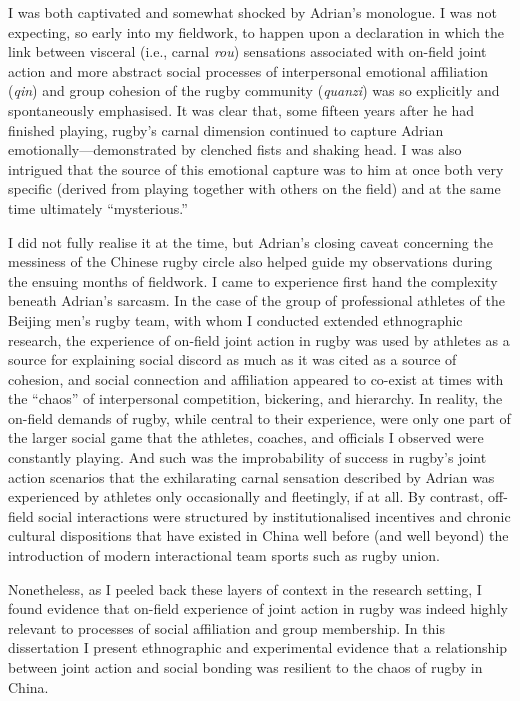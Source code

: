 
I was both captivated and somewhat shocked by Adrian's monologue. I was not expecting, so early into my fieldwork, to happen upon a declaration in which the link between visceral (i.e., carnal \textit{rou}) sensations associated with on-field joint action and more abstract social processes of interpersonal emotional affiliation (\textit{qin}) and group cohesion of the rugby community (\textit{quanzi}) was so explicitly and spontaneously emphasised.  It was clear that, some fifteen years after he had finished playing, rugby's carnal dimension continued to capture Adrian emotionally---demonstrated by clenched fists and shaking head.  I was also intrigued that the source of this emotional capture was to him at once both very specific (derived from playing together with others on the field) and at the same time ultimately ``mysterious.''

I did not fully realise it at the time, but Adrian's closing caveat concerning the messiness of the Chinese rugby circle also helped guide my observations during the ensuing months of fieldwork.  I came to experience first hand the complexity beneath Adrian's sarcasm.  In the case of the group of professional athletes of the Beijing men's rugby team, with whom I conducted extended ethnographic research, the experience of on-field joint action in rugby was used by athletes as a source for explaining social discord as much as it was cited as a source of cohesion, and social connection and affiliation appeared to co-exist at times with the ``chaos'' of interpersonal competition, bickering, and hierarchy.  In reality, the on-field demands of rugby, while central to their experience, were only one part of the larger social game that the athletes, coaches, and officials I observed were constantly playing.  And such was the improbability of success in rugby's joint action scenarios that the exhilarating carnal sensation described by Adrian was experienced by athletes only occasionally and fleetingly, if at all.  By contrast, off-field social interactions were structured by institutionalised incentives and chronic cultural dispositions that have existed in China well before (and well beyond) the introduction of modern interactional team sports such as rugby union.

Nonetheless, as I peeled back these layers of context in the research setting, I found evidence that on-field experience of joint action in rugby was indeed highly relevant to processes of social affiliation and group membership.  In this dissertation I present ethnographic and experimental evidence that a relationship between joint action and social bonding was resilient to the chaos of rugby in China.

